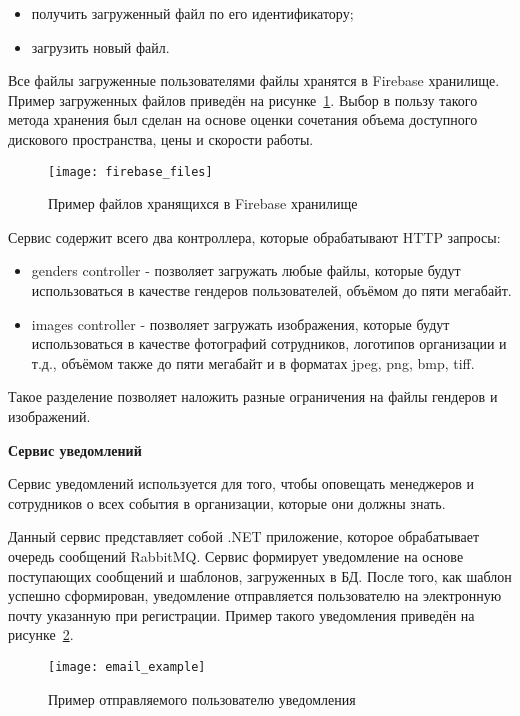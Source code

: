 \begin{itemize}
    \item получить загруженный файл по его идентификатору;
    \item загрузить новый файл.
\end{itemize}

Все файлы загруженные пользователями файлы хранятся в Firebase хранилище. Пример загруженных файлов приведён на рисунке~\ref{fig:firebase_files}. Выбор в пользу такого метода хранения был сделан на основе оценки сочетания объема доступного дискового пространства, цены и скорости работы.

\begin{figure}[ht]
    \centering
    \texttt{[image: firebase\_files]}
    \caption{Пример файлов хранящихся в Firebase хранилище}\label{fig:firebase_files}
\end{figure}

Сервис содержит всего два контроллера, которые обрабатывают HTTP запросы:
\begin{itemize}
    \item genders controller - позволяет загружать любые файлы, которые будут использоваться в качестве гендеров пользователей, объёмом до пяти мегабайт.
    \item images controller - позволяет загружать изображения, которые будут использоваться в качестве фотографий сотрудников, логотипов организации и т.д., объёмом также до пяти мегабайт и в форматах jpeg, png, bmp, tiff.
\end{itemize}

Такое разделение позволяет наложить разные ограничения на файлы гендеров и изображений.

\newpage
\textbf{Сервис уведомлений}

Сервис уведомлений используется для того, чтобы оповещать менеджеров и сотрудников о всех события в организации, которые они должны знать.

Данный сервис представляет собой .NET приложение, которое обрабатывает очередь сообщений RabbitMQ. Сервис формирует уведомление на основе поступающих сообщений и шаблонов, загруженных в БД. После того, как шаблон успешно сформирован, уведомление отправляется пользователю на электронную почту указанную при регистрации. Пример такого уведомления приведён на рисунке~\ref{fig:email_example}.

\begin{figure}[ht]
    \centering
    \texttt{[image: email\_example]}
    \caption{Пример отправляемого пользователю уведомления}\label{fig:email_example}
\end{figure}

